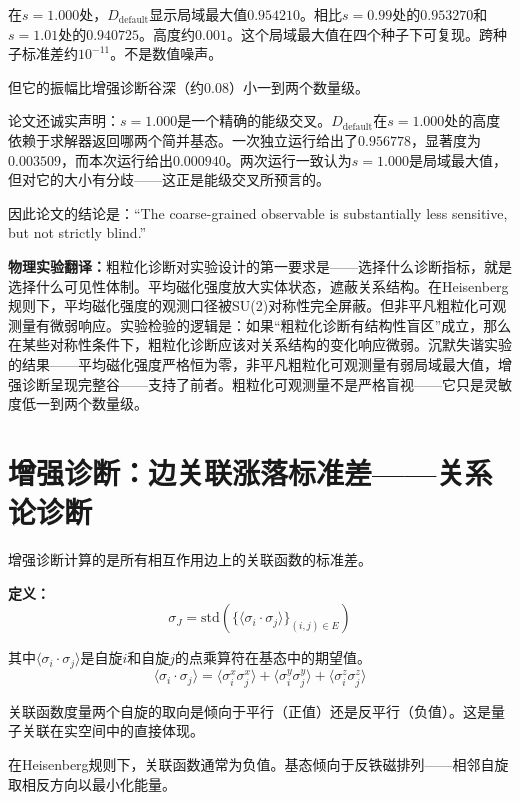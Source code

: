 \documentclass[11pt,a4paper]{book}
\theoremstyle{definition}
\begin{document}
在$s=1.000$处，$D_{\text{default}}$显示局域最大值$0.954210$。相比$s=0.99$处的$0.953270$和$s=1.01$处的$0.940725$。高度约$0.001$。这个局域最大值在四个种子下可复现。跨种子标准差约$10^{-11}$。不是数值噪声。

但它的振幅比增强诊断谷深（约$0.08$）小一到两个数量级。

论文还诚实声明：$s=1.000$是一个精确的能级交叉。$D_{\text{default}}$在$s=1.000$处的高度依赖于求解器返回哪两个简并基态。一次独立运行给出了$0.956778$，显著度为$0.003509$，而本次运行给出$0.000940$。两次运行一致认为$s=1.000$是局域最大值，但对它的大小有分歧——这正是能级交叉所预言的。

因此论文的结论是：“The coarse-grained observable is substantially less sensitive, but not strictly blind.”

\textbf{物理实验翻译：}粗粒化诊断对实验设计的第一要求是——选择什么诊断指标，就是选择什么可见性体制。平均磁化强度放大实体状态，遮蔽关系结构。在Heisenberg规则下，平均磁化强度的观测口径被SU(2)对称性完全屏蔽。但非平凡粗粒化可观测量有微弱响应。实验检验的逻辑是：如果“粗粒化诊断有结构性盲区”成立，那么在某些对称性条件下，粗粒化诊断应该对关系结构的变化响应微弱。沉默失谐实验的结果——平均磁化强度严格恒为零，非平凡粗粒化可观测量有弱局域最大值，增强诊断呈现完整谷——支持了前者。粗粒化可观测量不是严格盲视——它只是灵敏度低一到两个数量级。

\section{增强诊断：边关联涨落标准差——关系论诊断}

增强诊断计算的是所有相互作用边上的关联函数的标准差。

\textbf{定义：}
\begin{equation}
\sigma_J = \text{std}\left(\{\langle \sigma_i \cdot \sigma_j \rangle\}_{(i,j) \in E}\right)
\end{equation}

其中$\langle\sigma_i\cdot\sigma_j\rangle$是自旋$i$和自旋$j$的点乘算符在基态中的期望值。
\begin{equation}
\langle \sigma_i \cdot \sigma_j \rangle = \langle \sigma_i^x \sigma_j^x \rangle + \langle \sigma_i^y \sigma_j^y \rangle + \langle \sigma_i^z \sigma_j^z \rangle
\end{equation}

关联函数度量两个自旋的取向是倾向于平行（正值）还是反平行（负值）。这是量子关联在实空间中的直接体现。

在Heisenberg规则下，关联函数通常为负值。基态倾向于反铁磁排列——相邻自旋取相反方向以最小化能量。
\end{document}
